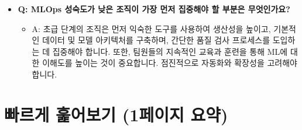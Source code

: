 \documentclass[11pt,a4paper]{article}
\theoremstyle{definition}
\begin{document}
\begin{itemize}
    \item \textbf{Q: MLOps 성숙도가 낮은 조직이 가장 먼저 집중해야 할 부분은 무엇인가요?}
    \begin{itemize}
        \item A: 초급 단계의 조직은 먼저 익숙한 도구를 사용하여 생산성을 높이고, 기본적인 데이터 및 모델 아키텍처를 구축하며, 간단한 품질 검사 프로세스를 도입하는 데 집중해야 합니다. 또한, 팀원들의 지속적인 교육과 훈련을 통해 ML에 대한 이해도를 높이는 것이 중요합니다. 점진적으로 자동화와 확장성을 고려해야 합니다.
    \end{itemize}
\end{itemize}

\newpage
\section{빠르게 훑어보기 (1페이지 요약)}
\end{document}
